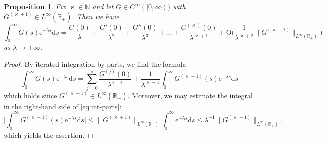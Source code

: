 \documentclass{amsart}
\newcommand{\be}{\begin{equation}}
\newcommand{\ee}{\end{equation}}
\newcommand{\N}{\mathbb{N}}
\newcommand{\R}{\mathbb{R}}
\newcommand{\diff}{\mathrm{d}}
\newtheorem{prop}[thm]{Proposition}
\theoremstyle{definition}
\theoremstyle{remark}
\newcommand{\e}{\mathrm{e}}
\newcommand{\Ordo}{\mathrm{O}}
\numberwithin{equation}{subsection}
\begin{document}
\begin{prop}\label{prop:PI-Laplace}
Fix $\varkappa\in\N$ and let $G\in C^{\infty}([0,\infty))$ 
with $G^{(\varkappa+1)}\in L^\infty(\R_+)$. Then we have
\be
\int_0^\infty G(s)\e^{-\lambda s}\diff s= \frac{G(0)}{\lambda}
+\frac{G'(0)}{\lambda^2}+
\frac{G''(0)}{\lambda^3}+\ldots 
+ \frac{G^{(\varkappa)}(0)}{\lambda^{\varkappa+1}} 
+ \Ordo\Big(\frac{1}{\lambda^{\varkappa+2}}
\lVert G^{(\varkappa+1)}\rVert_{L^\infty(\R_+)}\Big)
\ee
as $\lambda\to+\infty$.
\end{prop}

\begin{proof}
By iterated integration by parts, 
we find the formula
\be\label{eq:int-parts}
\int_0^\infty G(s)\e^{-\lambda s}\diff s= \sum_{j=0}^{\varkappa}
\frac{G^{(j)}(0)}{\lambda^{j+1}}
+\frac{1}{\lambda^{\varkappa+1}}\int_0^\infty 
G^{(\varkappa+1)}(s)\e^{-\lambda s}\diff s
\ee
which holds since $G^{(\varkappa+1)}\in L^\infty(\R_+)$.
Moreover, we may estimate the integral in the right-hand side
of \eqref{eq:int-parts}:
\be
\Big|\int_0^\infty G^{(\varkappa+1)}(s)\e^{-\lambda s}\diff s\Big|
\le \lVert G^{(\varkappa+1)}\rVert_{L^\infty(\R_+)}\int_0^\infty\e^{-\lambda s}\diff s
\le \lambda^{-1}\lVert G^{(\varkappa+1)}\rVert_{L^\infty(\R_+)},
\ee
which yields the assertion.
\end{proof}
\end{document}
